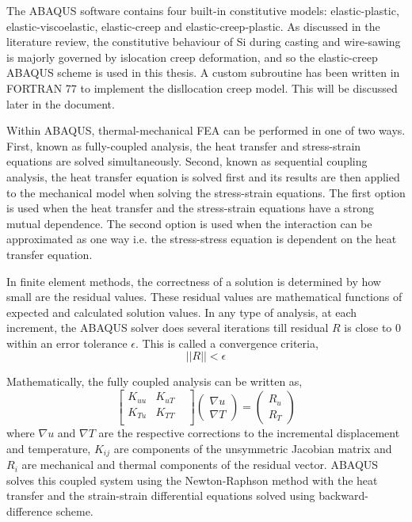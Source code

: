 The ABAQUS software contains four built-in constitutive models: elastic-plastic, elastic-viscoelastic, elastic-creep and elastic-creep-plastic. As discussed in the literature review, the constitutive behaviour of Si during casting and wire-sawing is majorly governed by islocation creep deformation, and so the elastic-creep ABAQUS scheme is used in this thesis. A custom  subroutine has been written in FORTRAN 77 to implement the disllocation creep model. This will be discussed later in the document. 

Within ABAQUS, thermal-mechanical FEA can be performed in one of two ways. First, known as fully-coupled analysis, the heat transfer and stress-strain equations are solved simultaneously. Second, known as sequential coupling analysis, the heat transfer equation is solved first and its results are then applied to the mechanical model when solving the stress-strain equations. The first option is used when the heat transfer and the stress-strain equations have a strong mutual dependence. The second option is used when the interaction can be approximated as one way i.e. the stress-stress equation is dependent on the heat transfer equation.

In finite element methods, the correctness of a solution is determined by how small are the residual values. These residual values are mathematical functions of expected and calculated solution values. In any type of analysis, at each increment, the ABAQUS solver does several iterations till residual $R$ is close to 0 within an error tolerance  $\epsilon$. This is called a convergence criteria,
\begin{equation}
||R||<\epsilon
\label {residualsl}
\end{equation}

Mathematically, the fully coupled analysis can be written as, 
\begin{equation}
\begin{bmatrix}
K_{uu} &  K_{uT} & \\ 
K_{Tu} &  K_{TT} & \\ 
\end{bmatrix} 
\begin{pmatrix}
\nabla u\\ 
\nabla T
\end{pmatrix}
= 
\begin{pmatrix}
R_{u}\\ 
R_{T}
\end{pmatrix}
\label {coupled_anal}
\end{equation}
where $\nabla u$ and $\nabla T$ are the respective corrections to the incremental displacement and temperature, $K_{ij}$ are components of the unsymmetric Jacobian matrix and $R_{i}$ are mechanical and thermal components of the residual vector. ABAQUS solves this coupled system using the Newton-Raphson method with the heat transfer and the strain-strain differential equations solved using backward-difference scheme.

